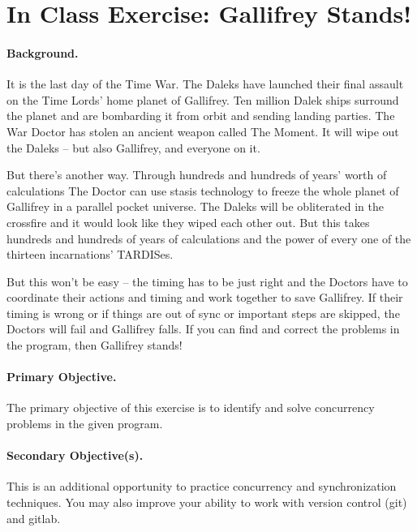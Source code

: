 




\section*{In Class Exercise: Gallifrey Stands!}

\paragraph{Background.}
It is the last day of the Time War. The Daleks have launched their final assault on the Time Lords' home planet of Gallifrey. Ten million Dalek ships surround the planet and are bombarding it from orbit and sending landing parties. The War Doctor has stolen an ancient weapon called The Moment. It will wipe out the Daleks -- but also Gallifrey, and everyone on it. 

But there's another way. Through hundreds and hundreds of years' worth of calculations The Doctor can use stasis technology to freeze the whole planet of Gallifrey in a parallel pocket universe. The Daleks will be obliterated in the crossfire and it would look like they wiped each other out. But this takes hundreds and hundreds of years of calculations and the power of every one of the thirteen incarnations' TARDISes.

But this won't be easy -- the timing has to be just right and the Doctors have to coordinate their actions and timing and work together to save Gallifrey. If their timing is wrong or if things are out of sync or important steps are skipped, the Doctors will fail and Gallifrey falls. If you can find and correct the problems in the program, then Gallifrey stands! 


\paragraph{Primary Objective.} The primary objective of this exercise is to identify and solve concurrency problems in the given program.

\paragraph{Secondary Objective(s).} This is an additional opportunity to practice concurrency and synchronization techniques. You may also improve your ability to work with version control (git) and gitlab.

